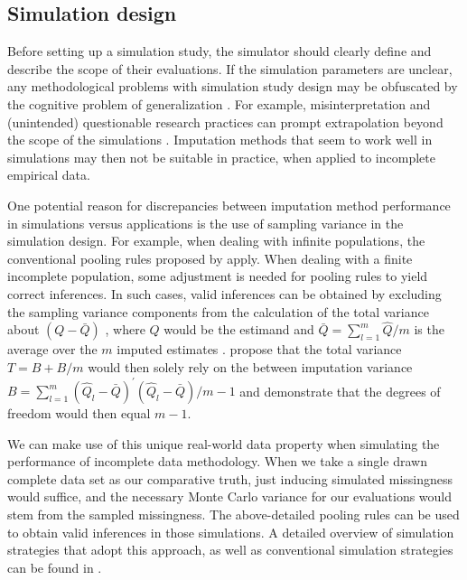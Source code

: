 \documentclass[bimj,fleqn]{w-art}
\begin{document}

\subsection{Simulation design}

Before setting up a simulation study, the simulator should clearly define and describe the scope of their evaluations. If the simulation parameters are unclear, any methodological problems with simulation study design may be obfuscated by the cognitive problem of generalization \citep{gree17}. For example, misinterpretation and (unintended) questionable research practices can prompt extrapolation beyond the scope of the simulations \citep{gree17, pawe22}. Imputation methods that seem to work well in simulations may then not be suitable in practice, when applied to incomplete empirical data.

One potential reason for discrepancies between imputation method performance in simulations versus applications is the use of sampling variance in the simulation design. For example, when dealing with infinite populations, the conventional pooling rules proposed by \citep[cf.][p. 76-77]{rubi87} apply. When dealing with a finite incomplete population, some adjustment is needed for pooling rules to yield correct inferences. In such cases, valid inferences can be obtained by excluding the sampling variance components from the calculation of the total variance about $(Q - \bar{Q})$ \citep{vink14, raghunathan2003multiple}, where $Q$ would be the estimand and $\bar{Q} = \sum_{l=1}^m \hat{Q}/m$ is the average over the $m$ imputed estimates \citep[cf.][p. 76-77]{rubi87}. \citet{vink14} propose that the total variance $T=B+B/m$ would then solely rely on the between imputation variance $B = \sum_{l=1}^m (\hat{Q}_l - \bar{Q})^\prime(\hat{Q}_l - \bar{Q}) / m-1$ and demonstrate that the degrees of freedom would then equal $m-1$. 

We can make use of this unique real-world data property when simulating the performance of incomplete data methodology. When we take a single drawn complete data set as our comparative truth, just inducing simulated missingness would suffice, and the necessary Monte Carlo variance for our evaluations would stem from the sampled missingness. The above-detailed pooling rules can be used to obtain valid inferences in those simulations. A detailed overview of simulation strategies that adopt this approach, as well as conventional simulation strategies can be found in \citet{simmiss}. 
\end{document}

